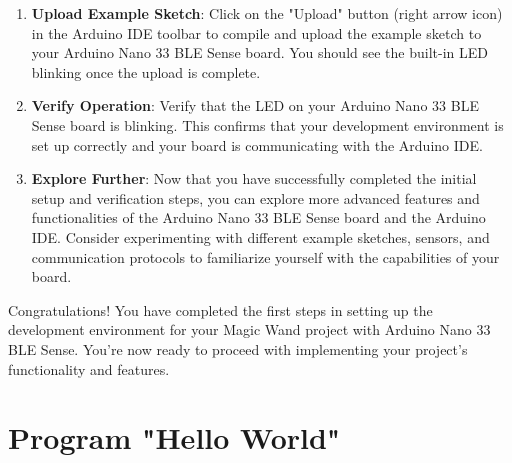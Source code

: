 \begin{enumerate}
    \item \textbf{Upload Example Sketch}: Click on the "Upload" button (right arrow icon) in the Arduino IDE toolbar to compile and upload the example sketch to your Arduino Nano 33 BLE Sense board. You should see the built-in LED blinking once the upload is complete.
    
    \item \textbf{Verify Operation}: Verify that the LED on your Arduino Nano 33 BLE Sense board is blinking. This confirms that your development environment is set up correctly and your board is communicating with the Arduino IDE.
    
    \item \textbf{Explore Further}: Now that you have successfully completed the initial setup and verification steps, you can explore more advanced features and functionalities of the Arduino Nano 33 BLE Sense board and the Arduino IDE. Consider experimenting with different example sketches, sensors, and communication protocols to familiarize yourself with the capabilities of your board.\cite{ArduinoIntroduction:2018}
\end{enumerate}

Congratulations! You have completed the first steps in setting up the development environment for your Magic Wand project with Arduino Nano 33 BLE Sense. You're now ready to proceed with implementing your project's functionality and features.

\section{Program "Hello World"}

